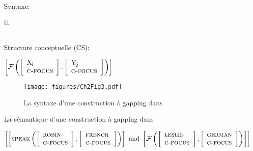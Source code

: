 \noindent
Syntaxe:
\begin{avm}\textsuperscript{IL}
\end{avm}\\
Structure conceptuelle (CS):	
\begin{avm}\relax
$\left[\mathcal{F}\left(\left[\begin{array}{l}
                                \text{X\textsubscript{i}}\\\text{\scshape c-focus}
                               \end{array}
\right], \left[
	  \begin{array}{l}
	  \text{Y\textsubscript{j}}\\\text{\scshape c-focus}
	  \end{array}\right]\right)\right]$
\end{avm}
\z

   
   \begin{figure} 
   
   \texttt{[image: figures/Ch2Fig3.pdf]}
   
   \caption{La syntaxe d’une construction à gapping dans \citet{CulicoverEtAl2005}}
   \label{ch2:fig3}
   \end{figure}


\ea \label{ch2:ex246}
La sémantique d’une construction à gapping dans \citet{CulicoverEtAl2005}

\begin{avm}
$\left[\left[\text{\scshape speak} \left(\left[\begin{array}{l}\text{\scshape robin}\\\text{\scshape c-focus}\end{array}\right], \left[\begin{array}{l} \text{\scshape french}\\\text{\scshape c-focus}\end{array}\right]\right)\right]   \text{ and }\left[\mathcal{F}\left(\left[\begin{array}{l}\text{\scshape leslie}\\\text{\scshape c-focus}\end{array}\right], \left[\begin{array}{l}\text{\scshape german}\\\text{\scshape c-focus}\end{array}\right]\right)\right]\right]$
\end{avm}
\z

